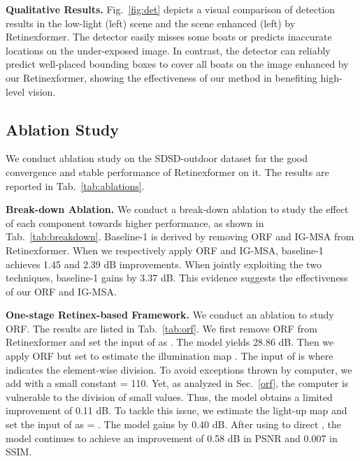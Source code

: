 \documentclass[10pt,twocolumn,letterpaper]{article}
\begin{document}
\vspace{0.5mm}
\noindent\textbf{Qualitative Results.} Fig.~\ref{fig:det} depicts a visual comparison of detection results in the low-light (left) scene and the scene enhanced (left) by  Retinexformer. The detector easily misses some boats or predicts inaccurate locations on the under-exposed image. In contrast, the detector can reliably predict well-placed  bounding boxes to cover all boats on the image enhanced by our Retinexformer, showing the effectiveness of our  method in benefiting high-level vision.




\vspace{-0.2mm}
\subsection{Ablation Study}
\vspace{-0.3mm}
We conduct ablation study on the SDSD-outdoor dataset for the good convergence and stable performance of Retinexformer on it. The results are reported in Tab.~\ref{tab:ablations}.

\vspace{0.5mm}
\noindent\textbf{Break-down Ablation.} We conduct a break-down ablation to study the effect of each component towards higher performance, as shown in Tab.~\ref{tab:breakdown}.  Baseline-1 is derived by removing ORF and IG-MSA from  Retinexformer. When we respectively apply ORF and IG-MSA, baseline-1 achieves 1.45 and 2.39 dB improvements. When jointly exploiting the two techniques, baseline-1 gains by 3.37 dB. This evidence suggests the effectiveness of our ORF and IG-MSA.

\vspace{0.5mm}
\noindent\textbf{One-stage Retinex-based Framework.} We conduct an ablation to study ORF. The results are listed in Tab.~\ref{tab:orf}. We first remove ORF from Retinexformer and set the input of  as . The model yields 28.86 dB. Then we apply ORF but set  to estimate the illumination map . The input of  is  where  indicates the element-wise division. To avoid exceptions thrown by computer, we add  with a small constant  = 110. Yet, as analyzed in Sec.~\ref{orf}, the computer is vulnerable to the division of small values. Thus, the model obtains a limited improvement of 0.11 dB. To tackle this issue, we estimate the light-up map  and set the input of  as  = . The model gains by 0.40 dB. After using   to direct , the model continues to achieve an improvement of 0.58 dB in PSNR and 0.007 in SSIM.
\end{document}
